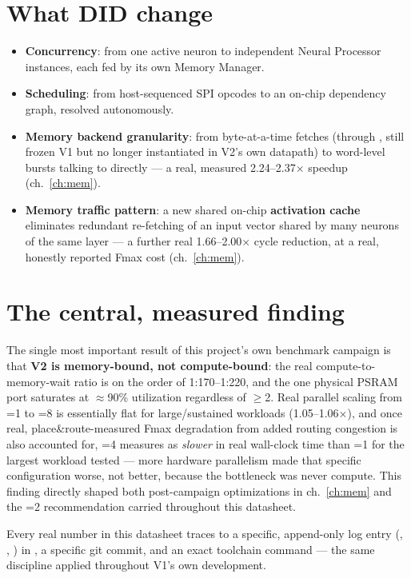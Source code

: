 \section{What DID change}
\begin{itemize}
\item \textbf{Concurrency}: from one active neuron to 
      independent Neural Processor instances, each fed by its own Memory
      Manager.
\item \textbf{Scheduling}: from host-sequenced SPI opcodes to an on-chip
      dependency graph, resolved autonomously.
\item \textbf{Memory backend granularity}: from byte-at-a-time fetches
      (through , still frozen V1 but no
      longer instantiated in V2's own datapath) to word-level bursts
      talking to  directly --- a real, measured
      2.24--2.37$\times$ speedup (ch.~\ref{ch:mem}).
\item \textbf{Memory traffic pattern}: a new shared on-chip
      \textbf{activation cache} eliminates redundant re-fetching of an
      input vector shared by many neurons of the same layer --- a
      further real 1.66--2.00$\times$ cycle reduction, at a real, honestly
      reported Fmax cost (ch.~\ref{ch:mem}).
\end{itemize}

\section{The central, measured finding}
The single most important result of this project's own benchmark
campaign is that \textbf{V2 is memory-bound, not compute-bound}: the
real compute-to-memory-wait ratio is on the order of 1:170--1:220, and
the one physical PSRAM port saturates at $\approx$90\% utilization
regardless of $\ge$2. Real parallel scaling from
=1 to =8 is essentially flat for
large/sustained workloads (1.05--1.06$\times$), and once real,
place\&route-measured Fmax degradation from added routing congestion is
also accounted for, =4 measures as \emph{slower} in real
wall-clock time than =1 for the largest workload tested
--- more hardware parallelism made that specific configuration worse,
not better, because the bottleneck was never compute. This finding
directly shaped both post-campaign optimizations in ch.~\ref{ch:mem} and
the =2 recommendation carried throughout this datasheet.

\begin{fnnote}[Reproducibility]
Every real number in this datasheet traces to a specific, append-only
log entry (, ,
) in , a specific git
commit, and an exact toolchain command --- the same discipline applied
throughout V1's own development.
\end{fnnote}
